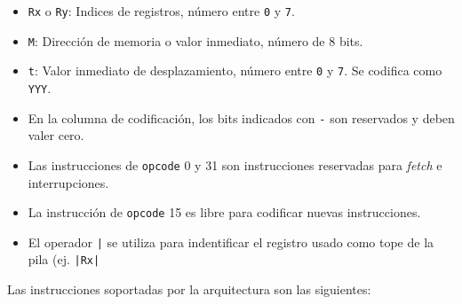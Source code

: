 \documentclass[a4paper,11pt]{article}
\begin{document}
\small
\begin{itemize}
 \setlength\itemsep{0em}
 \item \texttt{Rx} o \texttt{Ry}: Indices de registros, número entre \texttt{0} y \texttt{7}.
 \item \texttt{M}: Dirección de memoria o valor inmediato, número de 8 bits.
 \item \texttt{t}: Valor inmediato de desplazamiento, número entre \texttt{0} y \texttt{7}. Se codifica como \texttt{YYY}.
 \item En la columna de codificación, los bits indicados con \texttt{-} son reservados y deben valer cero.
 \item Las instrucciones de \texttt{opcode} 0 y 31 son instrucciones reservadas para \emph{fetch} e interrupciones.
 \item La instrucción de \texttt{opcode} 15 es libre para codificar nuevas instrucciones.
 \item El operador \texttt{|} se utiliza para indentificar el registro usado como tope de la pila (ej. \texttt{|Rx|}
\end{itemize}
\normalsize

\noindent Las instrucciones soportadas por la arquitectura son las siguientes:
\end{document}
